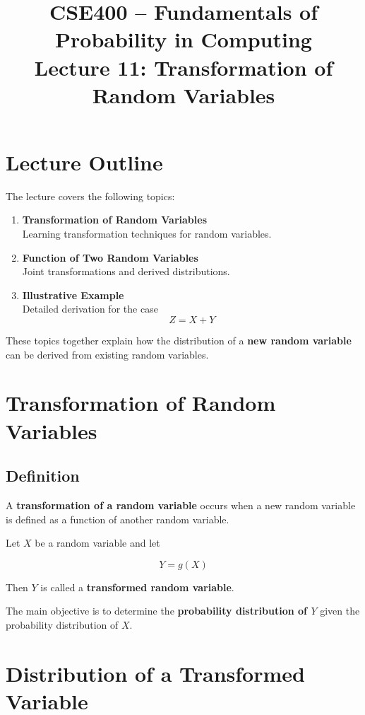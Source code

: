\documentclass[12pt]{article}
\title{CSE400 -- Fundamentals of Probability in Computing\\
Lecture 11: Transformation of Random Variables}
\date{}
\begin{document}
\maketitle

\section*{Lecture Outline}

The lecture covers the following topics:

\begin{enumerate}
\item \textbf{Transformation of Random Variables} \\
Learning transformation techniques for random variables.

\item \textbf{Function of Two Random Variables} \\
Joint transformations and derived distributions.

\item \textbf{Illustrative Example} \\
Detailed derivation for the case
\[
Z = X + Y
\]
\end{enumerate}

These topics together explain how the distribution of a \textbf{new random variable} can be derived from existing random variables.

\section{Transformation of Random Variables}

\subsection*{Definition}

A \textbf{transformation of a random variable} occurs when a new random variable is defined as a function of another random variable.

Let $X$ be a random variable and let

\[
Y = g(X)
\]

Then $Y$ is called a \textbf{transformed random variable}.

The main objective is to determine the \textbf{probability distribution of $Y$} given the probability distribution of $X$.

\section{Distribution of a Transformed Variable}
\end{document}
